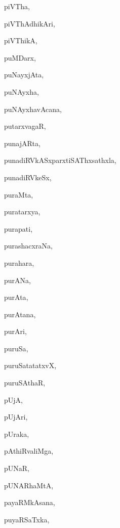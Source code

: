 \begin{multicols}{3}
{\noindent
{piVTha}, \pageref{piVTha}

\noindent
{piVThAdhikAri}, \pageref{piVThAdhikAri}

\noindent
{piVThikA}, \pageref{piVThikA}

\noindent
{puMDarx}, \pageref{puMDarx}

\noindent
{puNayxjAta}, \pageref{puNayxjAta}

\noindent
{puNAyxha}, \pageref{puNAyxha}

\noindent
{puNAyxhavAcana}, \pageref{puNAyxhavAcana}

\noindent
{putarxvagaR}, \pageref{putarxvagaR}

\noindent
{punajARta}, \pageref{punajARta}

\noindent
{punadiRVkASxparxtiSAThxsathxla}, \pageref{punadiRVkASxparxtiSAThxsathxla}

\noindent
{punadiRVkeSx}, \pageref{punadiRVkeSx}

\noindent
{puraMta}, \pageref{puraMta}

\noindent
{puratarxya}, \pageref{puratarxya}

\noindent
{purapati}, \pageref{purapati}

\noindent
{purashacxraNa}, \pageref{purashacxraNa}

\noindent
{purahara}, \pageref{purahara}

\noindent
{purANa}, \pageref{purANa}

\noindent
{purAta}, \pageref{purAta}

\noindent
{purAtana}, \pageref{purAtana}

\noindent
{purAri}, \pageref{purAri}

\noindent
{puruSa}, \pageref{puruSa}

\noindent
{puruSatatatxvX}, \pageref{puruSatatatxvX}

\noindent
{puruSAthaR}, \pageref{puruSAthaR}

\noindent
{pUjA}, \pageref{pUjA}

\noindent
{pUjAri}, \pageref{pUjAri}

\noindent
{pUraka}, \pageref{pUraka}

\noindent
{pAthiRvaliMga}, \pageref{pAthiRvaliMga}

\noindent
{pUNaR}, \pageref{pUNaR}

\noindent
{pUNARhaMtA}, \pageref{pUNARhaMtA}

\noindent
{payaRMkAsana}, \pageref{payaRMkAsana}

\noindent
{puyaRSaTxka}, \pageref{puyaRSaTxka}

}
\end{multicols}
